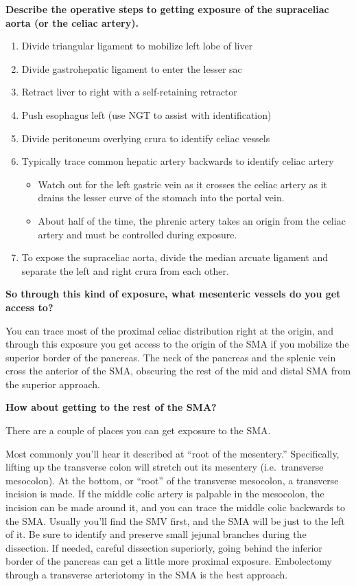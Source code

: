 \documentclass[
]{book}
\begin{document}
\textbf{Describe the operative steps to getting exposure of the supraceliac
aorta (or the celiac artery).}

\begin{enumerate}
\def\labelenumi{\arabic{enumi}.}
\item
  Divide triangular ligament to mobilize left lobe of liver
\item
  Divide gastrohepatic ligament to enter the lesser sac~
\item
  Retract liver to right with a self-retaining retractor
\item
  Push esophagus left (use NGT to assist with identification)
\item
  Divide peritoneum overlying crura to identify celiac vessels
\item
  Typically trace common hepatic artery backwards to identify celiac
  artery

  \begin{itemize}
  \item
    Watch out for the left gastric vein as it crosses the celiac
    artery as it drains the lesser curve of the stomach into the
    portal vein.
  \item
    About half of the time, the phrenic artery takes an origin from
    the celiac artery and must be controlled during exposure.
  \end{itemize}
\item
  To expose the supraceliac aorta, divide the median arcuate ligament
  and separate the left and right crura from each other.
\end{enumerate}

\textbf{So through this kind of exposure, what mesenteric vessels do you get
access to?}

You can trace most of the proximal celiac distribution right at the
origin, and through this exposure you get access to the origin of the
SMA if you mobilize the superior border of the pancreas. The neck of the
pancreas and the splenic vein cross the anterior of the SMA, obscuring
the rest of the mid and distal SMA from the superior approach.

\textbf{How about getting to the rest of the SMA?}

There are a couple of places you can get exposure to the SMA.~

Most commonly you'll hear it described at ``root of the mesentery.''
Specifically, lifting up the transverse colon will stretch out its
mesentery (i.e.~transverse mesocolon). At the bottom, or ``root'' of the
transverse mesocolon, a transverse incision is made. If the middle colic
artery is palpable in the mesocolon, the incision can be made around it,
and you can trace the middle colic backwards to the SMA. Usually you'll
find the SMV first, and the SMA will be just to the left of it. Be sure
to identify and preserve small jejunal branches during the dissection.
If needed, careful dissection superiorly, going behind the inferior
border of the pancreas can get a little more proximal exposure.
Embolectomy through a transverse arteriotomy in the SMA is the best
approach.\citep{wyersmarkcandmartin2019, kazmersOperativeManagementAcute1998}
\end{document}
